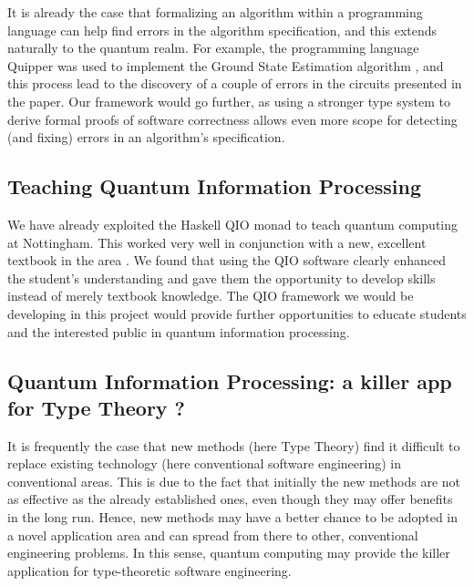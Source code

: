 \documentclass[a4paper]{article}
\begin{document}
It is already the case that formalizing an algorithm within a
programming language can help find errors in the algorithm
specification, and this extends naturally to the quantum realm. For
example, the programming language Quipper was used to implement the
Ground State Estimation algorithm \cite{GSE}, and this process lead to
the discovery of a couple of errors in the circuits presented in the
paper. Our framework would go further, as using a stronger type
system to derive formal proofs of software correctness allows even
more scope for detecting (and fixing) errors in an algorithm's
specification.

\subsection*{Teaching Quantum Information Processing}
\label{sec:teaching-qip}

We have already exploited the Haskell QIO monad to teach quantum
computing at Nottingham. This worked very well in conjunction with a
new, excellent textbook in the area \cite{Mermin}. We found that using
the QIO software clearly enhanced the student's understanding and gave
them the opportunity to develop skills instead of merely textbook
knowledge. The QIO framework we would be developing in
this project would provide further opportunities to educate students
and the interested public in quantum information processing. 

\subsection*{Quantum Information Processing: a killer app for Type Theory ?}
\label{sec:qip-killer-app}

It is frequently the case that new methods (here Type Theory) find it
difficult to replace existing technology (here conventional software
engineering) in conventional areas. This is due to the fact that
initially the new methods are not as effective as the already
established ones, even though they may offer benefits in the long
run. Hence, new methods may have a better chance to be adopted in a
novel application area and can spread from there to other, conventional
engineering problems. In this sense, quantum computing may provide the
killer application for type-theoretic software engineering.


 
\end{document}
